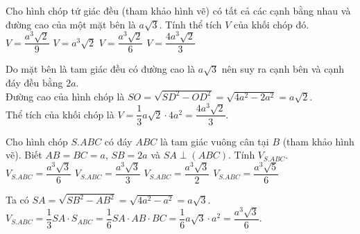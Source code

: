 \begin{ex}%
 \immini
 {
 Cho hình chóp tứ giác đều (tham khảo hình vẽ) có tất cả các cạnh bằng nhau và đường cao của một mặt bên là $a\sqrt{3}$. Tính thể tích $V$ của khối chóp đó.
 \choice
  {$V=\dfrac{a^3\sqrt{2}}{9}$}
  {$V=a^3\sqrt{2}$}
  {$V=\dfrac{a^3\sqrt{2}}{6}$}
  {\True $V=\dfrac{4a^3\sqrt{2}}{3}$}
 }
 {
 }
 \loigiai
  {
  Do mặt bên là tam giác đều có đường cao là $a\sqrt{3}$ nên suy ra cạnh bên và cạnh đáy đều bằng $2a$.\\
  Đường cao của hình chóp là $SO=\sqrt{SD^2-OD^2}=\sqrt{4a^2-2a^2}=a\sqrt{2}$.\\
  Thể tích của khối chóp là $V=\dfrac{1}{3}a\sqrt{2}\cdot 4a^2=\dfrac{4a^3\sqrt{2}}{3}$.
  }
\end{ex}

\begin{ex}%
 \immini
 {
 Cho hình chóp $S.ABC$ có đáy $ABC$ là tam giác vuông cân tại $B$ (tham khảo hình vẽ). Biết $AB=BC=a$, $SB=2a$ và $SA\perp (ABC)$. Tính $V_{S.ABC}$.
 \choice
  {\True $V_{S.ABC}=\dfrac{a^3\sqrt{3}}{6}$}
  {$V_{S.ABC}=\dfrac{a^3\sqrt{3}}{3}$}
  {$V_{S.ABC}=\dfrac{a^3\sqrt{3}}{2}$}
  {$V_{S.ABC}=\dfrac{a^3\sqrt{5}}{6}$}
 }
 {
 }
 \loigiai
  {
  Ta có $SA=\sqrt{SB^2-AB^2}=\sqrt{4a^2-a^2}=a\sqrt{3}$.\\
  $V_{S.ABC}=\dfrac{1}{3}SA\cdot S_{ABC}=\dfrac{1}{6}SA\cdot AB\cdot BC=\dfrac{1}{6}a\sqrt{3}\cdot a^2=\dfrac{a^3\sqrt{3}}{6}$.
  }
\end{ex}

